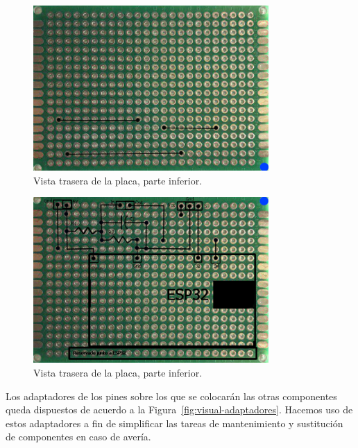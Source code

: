 \documentclass[a4paper,10pt]{article}
\begin{document}
\begin{figure}
  \centering
  \includegraphics[width=0.8\textwidth]{img/dibujo_placa_vista_inferior_parte_trasera.png}
  \caption{Vista trasera de la placa, parte inferior.}\label{fig:placa-tras-inf}
\end{figure}

\begin{figure}
  \centering
  \includegraphics[width=0.8\textwidth]{img/dibujo_placa_vista_superior_parte_trasera.png}
  \caption{Vista trasera de la placa, parte inferior.}\label{fig:placa-sup-inf}
\end{figure}

Los adaptadores de los pines sobre los que se colocarán las otras
componentes queda dispuestos de acuerdo a la
Figura~\ref{fig:visual-adaptadores}. Hacemos uso de estos adaptadores
a fin de simplificar las tareas de mantenimiento y sustitución de
componentes en caso de avería.
\end{document}
